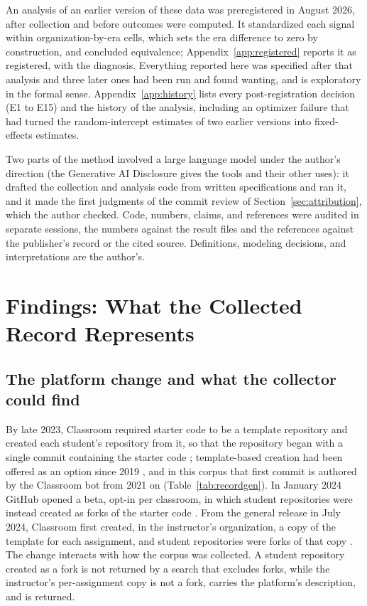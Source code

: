 \documentclass[acmsmall,screen,review,anonymous]{acmart}
\begin{document}
An analysis of an earlier version of these data was preregistered in August 2026, after collection and before outcomes were computed. It standardized each signal within organization-by-era cells, which sets the era difference to zero by construction, and concluded equivalence; Appendix~\ref{app:registered} reports it as registered, with the diagnosis. Everything reported here was specified after that analysis and three later ones had been run and found wanting, and is exploratory in the formal sense. Appendix~\ref{app:history} lists every post-registration decision (E1 to E15) and the history of the analysis, including an optimizer failure that had turned the random-intercept estimates of two earlier versions into fixed-effects estimates.

Two parts of the method involved a large language model under the author's direction (the Generative AI Disclosure gives the tools and their other uses): it drafted the collection and analysis code from written specifications and ran it, and it made the first judgments of the commit review of Section~\ref{sec:attribution}, which the author checked. Code, numbers, claims, and references were audited in separate sessions, the numbers against the result files and the references against the publisher's record or the cited source. Definitions, modeling decisions, and interpretations are the author's.

\section{Findings: What the Collected Record Represents}
\label{sec:record}

\subsection{The platform change and what the collector could find}
\label{sec:platform}

By late 2023, Classroom required starter code to be a template repository and created each student's repository from it, so that the repository began with a single commit containing the starter code \citep{github2023classroomchanges}; template-based creation had been offered as an option since 2019 \citep{github2019classroomboost}, and in this corpus that first commit is authored by the Classroom bot from 2021 on (Table~\ref{tab:recordgen}). In January 2024 GitHub opened a beta, opt-in per classroom, in which student repositories were instead created as forks of the starter code \citep{github2023classroomchanges, github2024forksbeta}. From the general release in July 2024, Classroom first created, in the instructor's organization, a copy of the template for each assignment, and student repositories were forks of that copy \citep{github2024forksga, githubdocs2026template}. The change interacts with how the corpus was collected. A student repository created as a fork is not returned by a search that excludes forks, while the instructor's per-assignment copy is not a fork, carries the platform's description, and is returned.
\end{document}
